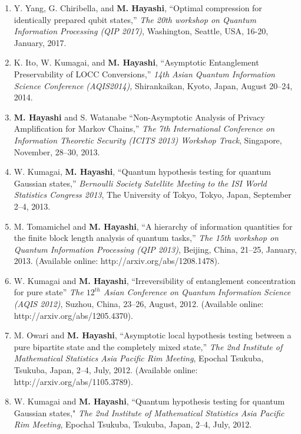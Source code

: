 \documentclass[a4paper,12pt,oneside]{article}
\begin{document}
\begin{enumerate}
\item 
Y. Yang, G. Chiribella, and \textbf{M. Hayashi}, ``Optimal compression for identically prepared qubit states,'' 
{\em The 20th workshop on Quantum Information Processing (QIP 2017)}, 
Washington, Seattle, USA, 16-20, January, 2017.

\item 
K. Ito, W. Kumagai, and \textbf{M. Hayashi}, 
``Asymptotic Entanglement Preservability of LOCC Conversions,'' 
{\em 14th Asian Quantum Information Science Conference (AQIS2014),} Shirankaikan, Kyoto, Japan, August 20--24, 2014.

\item 
\textbf{M. Hayashi} and S. Watanabe
``Non-Asymptotic Analysis of Privacy Amplification for Markov Chains,''
{\em The 7th International Conference on Information Theoretic Security (ICITS 2013) Workshop Track},
Singapore, November, 28--30, 2013.

\item
W. Kumagai, \textbf{M. Hayashi}, 
``Quantum hypothesis testing for quantum Gaussian states,'' 
{\em Bernoulli Society Satellite Meeting to the ISI World Statistics Congress 2013}, 
The University of Tokyo, Tokyo, Japan,
September 2--4, 2013.

\item 
M. Tomamichel and \textbf{M. Hayashi}, ``A hierarchy of information quantities for the finite block length analysis of quantum tasks,''
{\em The 15th workshop on Quantum Information Processing (QIP 2013)}, Beijing, China, 21--25, January, 2013.
(Available online: http://arxiv.org/abs/1208.1478).

\item 
W. Kumagai and \textbf{M. Hayashi}, ``Irreversibility of entanglement concentration for pure state''
{\em The $12^{th}$ Asian Conference on Quantum Information Science (AQIS 2012)},
Suzhou, China, 23--26, August, 2012.
(Available online: http://arxiv.org/abs/1205.4370).

\item 
M. Owari and \textbf{M. Hayashi}, 
``Asymptotic local hypothesis testing between a pure bipartite state and the completely mixed state,''
{\em The 2nd Institute of Mathematical Statistics Asia Pacific Rim Meeting}, 
Epochal Tsukuba, Tsukuba, Japan, 2--4, July, 2012.
(Available online: http://arxiv.org/abs/1105.3789).

\item 
W. Kumagai and \textbf{M. Hayashi}, 
``Quantum hypothesis testing for quantum Gaussian states," 
{\em The 2nd Institute of Mathematical Statistics Asia Pacific Rim Meeting}, 
Epochal Tsukuba, Tsukuba, Japan, 2--4, July, 2012.


\end{enumerate}
\end{document}
